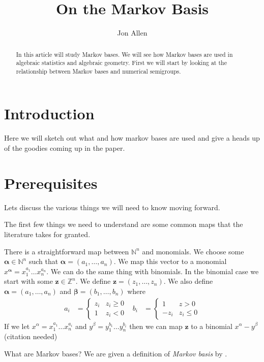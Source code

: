 \documentclass[11pt]{amsart}
\theoremstyle{plain}
\theoremstyle{definition}
\begin{document}
\title{On the Markov Basis}
\author{Jon Allen}
\begin{abstract}
In this article will study Markov bases. We will see how Markov bases are used in algebraic statistics and algebraic geometry. First we will start by looking at the relationship between Markov bases and numerical semigroups.
\end{abstract}
\maketitle
\section{Introduction}
Here we will sketch out what and how markov bases are used and give a heads up of the goodies coming up in the paper.
\section{Prerequisites}
Lets discuss the various things we will need to know moving forward.

The first few things we need to understand are some common maps that the literature takes for granted.

There is a straightforward map between $\mathbb{N}^n$ and monomials.
We choose some $\mathbf{\alpha}\in \mathbb{N}^n$ such that $\mathbf{\alpha}=(a_1,\dots,a_n)$.
We map this vector to a monomial $x^\mathbf{\alpha}=x_1^{a_1}\dots x_n^{a_n}$.
We can do the same thing with binomials.
In the binomial case we start with some $\mathbf{z}\in \mathbb{Z}^n$.
We define $\mathbf{z}=(z_1,\dots,z_n)$.
We also define $\mathbf{\alpha}=(a_1,\dots,a_n)$ and $\mathbf{\beta}=(b_1,\dots,b_n)$ where
\begin{align*}
  a_i&=\begin{cases}z_i&z_i\ge 0\\1&z_i<0\end{cases}&
  b_i&=\begin{cases}1&z> 0\\-z_i&z_i\le0\end{cases}
\end{align*}
If we let $x^\alpha=x_1^{a_1}\dots x_n^{a_i}$ and $y^\beta=y_1^{b_1}\dots y_n^{b_i}$ then we can map $\mathbf{z}$ to a binomial $x^\alpha-y^\beta$
(citation needed)

What are Markov bases? We are given a definition of \emph{Markov basis} by \cite{bernd}.
\end{document}
